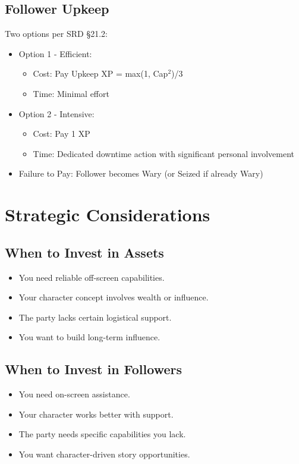 \documentclass[11pt,twoside,openany]{book}
\begin{document}
\subsection*{Follower Upkeep}

Two options per SRD §21.2:
\begin{itemize}
\item Option 1 - Efficient:
\begin{itemize}
\item Cost: Pay Upkeep XP = max(1, Cap$^2$)/3
\item Time: Minimal effort
\end{itemize}
\item Option 2 - Intensive:
\begin{itemize}
\item Cost: Pay 1 XP
\item Time: Dedicated downtime action with significant personal involvement
\end{itemize}
\item Failure to Pay: Follower becomes Wary (or Seized if already Wary)
\end{itemize}

\section*{Strategic Considerations} 

\subsection*{When to Invest in Assets}

\begin{itemize}
\item You need reliable off-screen capabilities.
\item Your character concept involves wealth or influence.
\item The party lacks certain logistical support.
\item You want to build long-term influence.
\end{itemize}

\subsection*{When to Invest in Followers}

\begin{itemize}
\item You need on-screen assistance.
\item Your character works better with support.
\item The party needs specific capabilities you lack.
\item You want character-driven story opportunities.
\end{itemize}
\end{document}
